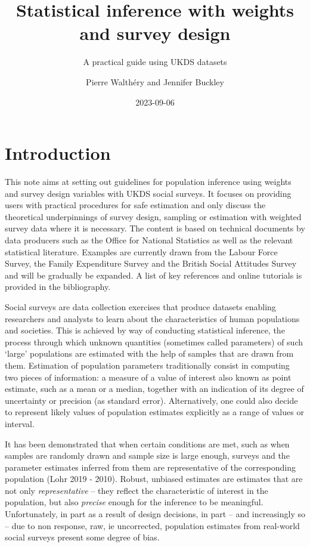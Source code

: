 \documentclass[
  14,
  a4paper,
  DIV=11,
  numbers=noendperiod]{scrartcl}
\title{Statistical inference with weights and survey design}
\subtitle{A practical guide using UKDS datasets}
\author{Pierre Walthéry and Jennifer Buckley}
\date{2023-09-06}
\begin{document}
\maketitle
\ifdefined\Shaded\renewenvironment{Shaded}{\begin{tcolorbox}[sharp corners, enhanced, boxrule=0pt, breakable, interior hidden, borderline west={3pt}{0pt}{shadecolor}, frame hidden]}{\end{tcolorbox}}\fi

\hypertarget{introduction}{%
\section*{Introduction}\label{introduction}}

This note aims at setting out guidelines for population inference using
weights and survey design variables with UKDS social surveys. It focuses
on providing users with practical procedures for safe estimation and
only discuss the theoretical underpinnings of survey design, sampling or
estimation with weighted survey data where it is necessary. The content
is based on technical documents by data producers such as the Office for
National Statistics as well as the relevant statistical literature.
Examples are currently drawn from the Labour Force Survey, the Family
Expenditure Survey and the British Social Attitudes Survey and will be
gradually be expanded. A list of key references and online tutorials is
provided in the bibliography.

Social surveys are data collection exercises that produce datasets
enabling researchers and analysts to learn about the characteristics of
human populations and societies. This is achieved by way of conducting
statistical inference, the process through which unknown quantities
(sometimes called parameters) of such `large' populations are estimated
with the help of samples that are drawn from them. Estimation of
population parameters traditionally consist in computing two pieces of
information: a measure of a value of interest also known as point
estimate, such as a mean or a median, together with an indication of its
degree of uncertainty or precision (as standard error). Alternatively,
one could also decide to represent likely values of population estimates
explicitly as a range of values or interval.

It has been demonstrated that when certain conditions are met, such as
when samples are randomly drawn and sample size is large enough, surveys
and the parameter estimates inferred from them are representative of the
corresponding population (Lohr 2019 - 2010). Robust, unbiased estimates
are estimates that are not only \emph{representative} -- they reflect
the characteristic of interest in the population, but also
\emph{precise} enough for the inference to be meaningful. Unfortunately,
in part as a result of design decisions, in part -- and increasingly so
-- due to non response, raw, ie uncorrected, population estimates from
real-world social surveys present some degree of bias.
\end{document}
